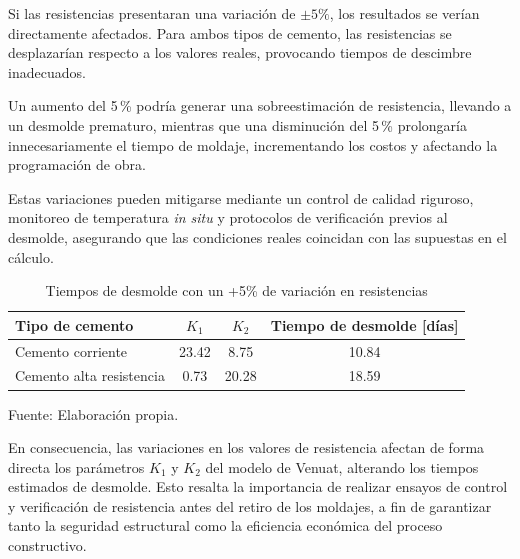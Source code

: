 Si las resistencias presentaran una variación de $\pm5\%$, los resultados se verían directamente afectados.  
Para ambos tipos de cemento, las resistencias se desplazarían respecto a los valores reales, provocando tiempos de descimbre inadecuados.  

Un aumento del 5\,\% podría generar una sobreestimación de resistencia, llevando a un desmolde prematuro, mientras que una disminución del 5\,\% prolongaría innecesariamente el tiempo de moldaje, incrementando los costos y afectando la programación de obra.

Estas variaciones pueden mitigarse mediante un control de calidad riguroso, monitoreo de temperatura \textit{in situ} y protocolos de verificación previos al desmolde, asegurando que las condiciones reales coincidan con las supuestas en el cálculo.

\begin{table}[H]
\centering
\renewcommand{\arraystretch}{1.20}
\caption{Tiempos de desmolde con un +5\% de variación en resistencias}
\small
\begin{tabular}{lccc}
\hline
\textbf{Tipo de cemento} & \textbf{$K_1$} & \textbf{$K_2$} & \textbf{Tiempo de desmolde [días]} \\ 
\hline
Cemento corriente & 23.42 & 8.75 & 10.84 \\ 
Cemento alta resistencia & 0.73 & 20.28 & 18.59 \\ 
\hline
\end{tabular}
\begin{center}
Fuente: Elaboración propia.
\end{center}
\end{table}

En consecuencia, las variaciones en los valores de resistencia afectan de forma directa los parámetros $K_1$ y $K_2$ del modelo de Venuat, alterando los tiempos estimados de desmolde.  
Esto resalta la importancia de realizar ensayos de control y verificación de resistencia antes del retiro de los moldajes, a fin de garantizar tanto la seguridad estructural como la eficiencia económica del proceso constructivo.
